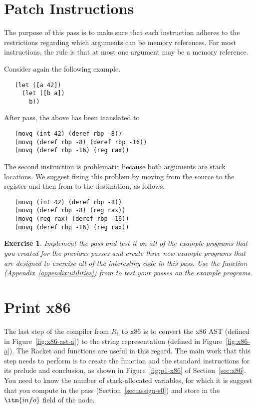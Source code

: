\documentclass[11pt]{book}
\newtheorem{exercise}[theorem]{Exercise}
\begin{document}
\section{Patch Instructions}
\label{sec:patch-s0}

The purpose of this pass is to make sure that each instruction adheres
to the restrictions regarding which arguments can be memory
references. For most instructions, the rule is that at most one
argument may be a memory reference.

Consider again the following example.
\begin{lstlisting}
   (let ([a 42])
     (let ([b a])
       b))
\end{lstlisting}
After  pass, the above has been translated to
\begin{lstlisting}
   (movq (int 42) (deref rbp -8))
   (movq (deref rbp -8) (deref rbp -16))
   (movq (deref rbp -16) (reg rax))
\end{lstlisting}
The second  instruction is problematic because both
arguments are stack locations. We suggest fixing this problem by
moving from the source to the register  and then from
 to the destination, as follows.
\begin{lstlisting}
   (movq (int 42) (deref rbp -8))
   (movq (deref rbp -8) (reg rax))
   (movq (reg rax) (deref rbp -16))
   (movq (deref rbp -16) (reg rax))
\end{lstlisting}

\begin{exercise}
\normalfont
Implement the  pass and test it on all of the
example programs that you created for the previous passes and create
three new example programs that are designed to exercise all of the
interesting code in this pass. Use the  function
(Appendix~\ref{appendix:utilities}) from  to test
your passes on the example programs.
\end{exercise}


\section{Print x86}
\label{sec:print-x86}

The last step of the compiler from $R_1$ to x86 is to convert the
x86 AST (defined in Figure~\ref{fig:x86-ast-a}) to the string
representation (defined in Figure~\ref{fig:x86-a}). The Racket
 and  functions are useful in this
regard. The main work that this step needs to perform is to create the
 function and the standard instructions for its prelude
and conclusion, as shown in Figure~\ref{fig:p1-x86} of
Section~\ref{sec:x86}. You need to know the number of
stack-allocated variables, for which it is suggest that you compute in
the  pass (Section~\ref{sec:assign-s0}) and store in
the $\itm{info}$ field of the  node.
\end{document}

